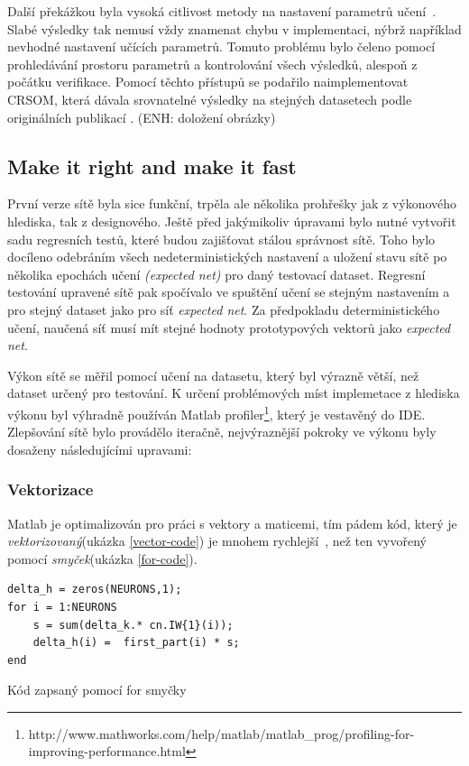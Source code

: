 \documentclass[thesis=M,czech]{FITthesis}[2012/06/26]
\begin{document}
Další překážkou byla vysoká citlivost metody na nastavení parametrů učení~\cite{hartonomain}. Slabé výsledky tak nemusí vždy znamenat chybu v implementaci, nýbrž například nevhodné nastavení učících parametrů. Tomuto problému bylo čeleno pomocí prohledávání prostoru parametrů a kontrolování všech výsledků, alespoň z počátku verifikace.
Pomocí těchto přístupů se podařilo naimplementovat CRSOM, která dávala srovnatelné výsledky na stejných datasetech podle originálních publikací \cite{hartonomain}. (ENH: doložení obrázky)

\subsection{Make it right and make it fast}

První verze sítě byla sice funkční, trpěla ale několika prohřešky jak z výkonového hlediska, tak z designového. Ještě před jakýmikoliv úpravami bylo nutné vytvořit sadu regresních testů, které budou zajišťovat stálou správnost sítě. Toho bylo docíleno odebráním všech nedeterministických nastavení a uložení stavu sítě po několika epochách učení \textit{(expected net)} pro daný testovací dataset.  Regresní testování upravené sítě pak spočívalo ve spuštění učení se stejným nastavením a pro stejný dataset jako pro síť \textit{expected net}. Za předpokladu deterministického učení, naučená síť musí mít stejné hodnoty prototypových vektorů jako \textit{expected net}.

Výkon sítě se měřil pomocí učení na datasetu, který byl výrazně větší, než dataset určený pro testování. K určení problémových míst implemetace z hlediska výkonu byl výhradně používán Matlab profiler\footnote{http://www.mathworks.com/help/matlab/matlab\_prog/profiling-for-improving-performance.html}, který je vestavěný do IDE. Zlepšování sítě bylo provádělo iteračně, nejvýraznější pokroky ve výkonu byly dosaženy následujícími upravami:





\subsubsection*{Vektorizace}
Matlab je optimalizován pro práci s vektory a maticemi, tím pádem kód, který je \textit{vektorizovaný}(ukázka \ref{vector-code}) je mnohem rychlejší~\cite{vector}, než ten vyvořený pomocí \textit{smyček}(ukázka \ref{for-code}).


\begin{listing}
\begin{verbatim}
delta_h = zeros(NEURONS,1);
for i = 1:NEURONS
    s = sum(delta_k.* cn.IW{1}(i));
    delta_h(i) =  first_part(i) * s;
end
\end{verbatim} 
\caption{Kód zapsaný pomocí for smyčky} 
\label{for-code}
\end{listing}
\end{document}
